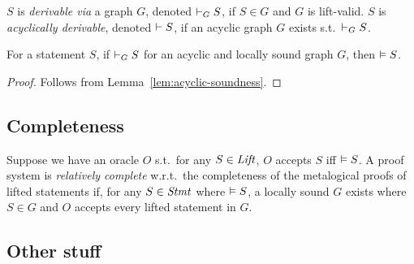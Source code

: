 \iffalse
\begin{lemma}
    Consider a graph $G=(\DomNode,\MapConc,\MapRule,\MapPrems)$,
    and a node $\node \in \DomNode$.
    If the subgraph of $G$ w.r.t.\ $\node$ is acyclic and valid,
    and all rules in the image of $\MapRule$ are locally sound,
    then $\VAL \MapConc(\node)$.
\end{lemma}
\fi

\newcommand{\DERby}[2]{\DER_{#1}{#2}}

\begin{definition}
    $S$ is \emph{derivable via} a graph $G$, 
    denoted $\DERby G S$,
    if $S \in G$ and $G$ is lift-valid.
    $S$ is \emph{acyclically derivable}, denoted $\vdash S$,
    if an acyclic graph $G$ exists s.t.\ $\DERby G S$.
\end{definition}

\begin{theorem}
    For a statement $S$,
    if $\DERby G S$ for an acyclic and locally sound graph $G$, %
    then $\vDash S$.
\end{theorem}

\begin{proof}
    Follows from Lemma~\ref{lem:acyclic-soundness}.
\end{proof}


\subsection{Completeness}

\begin{definition}
    Suppose we have an oracle $O$ s.t.\
    for any $S \in \mathit{Lift}$,
    $O$ accepts $S$ iff $\vDash S$.
    A proof system is \emph{relatively complete} w.r.t.\
    the completeness of the metalogical proofs of lifted statements
    if, for any $S \in \mathit{Stmt}$ where $\vDash S$,
    a locally sound $G$ exists where $S \in G$
    and $O$ accepts every lifted statement in $G$.
\end{definition}

\subsection{Other stuff}

